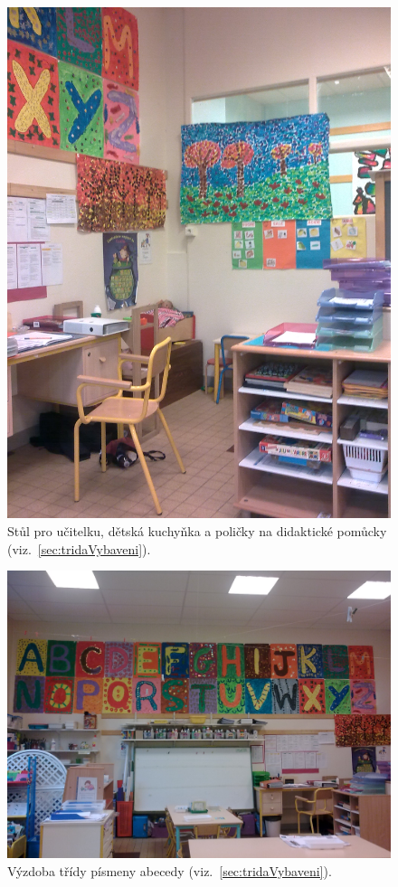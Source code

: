 	\begin{figure}[tb]
		\centering
		\includegraphics[height = 0.35\textheight]{./fotky/Obr5.jpg}
		\caption{
			Stůl pro učitelku, dětská kuchyňka a poličky na didaktické pomůcky (viz.~\ref{sec:tridaVybaveni}).
		}
		\label{Obr5}
	\end{figure}

	\begin{figure}[tb]
		\centering
		\includegraphics[height = 0.35\textheight]{./fotky/Obr6.jpg}
		\caption{
			Výzdoba třídy písmeny abecedy (viz.~\ref{sec:tridaVybaveni}).
		}
		\label{Obr6}
	\end{figure}


